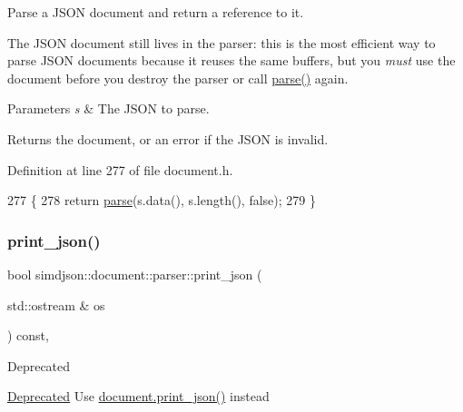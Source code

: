 Parse a J\+S\+ON document and return a reference to it. 

The J\+S\+ON document still lives in the parser\+: this is the most efficient way to parse J\+S\+ON documents because it reuses the same buffers, but you {\itshape must} use the document before you destroy the parser or call \hyperlink{classsimdjson_1_1document_1_1parser_a3eb1fd46ea0dad62eceed4b1c302b7ad}{parse()} again.


\begin{DoxyParams}{Parameters}
{\em s} & The J\+S\+ON to parse. \\
\hline
\end{DoxyParams}
\begin{DoxyReturn}{Returns}
the document, or an error if the J\+S\+ON is invalid. 
\end{DoxyReturn}


Definition at line 277 of file document.\+h.


\begin{DoxyCode}
277                                                                                           \{
278   \textcolor{keywordflow}{return} \hyperlink{classsimdjson_1_1document_1_1parser_a3eb1fd46ea0dad62eceed4b1c302b7ad}{parse}(s.data(), s.length(), \textcolor{keyword}{false});
279 \}
\end{DoxyCode}
\mbox{\label{classsimdjson_1_1document_1_1parser_ad6f0ed13d1344e219ba76c491158a05c}} 
\subsubsection{\texorpdfstring{print\+\_\+json()}{print\_json()}}
{\footnotesize\ttfamily bool simdjson\+::document\+::parser\+::print\+\_\+json (\begin{DoxyParamCaption}\item[{std\+::ostream \&}]{os }\end{DoxyParamCaption}) const\hspace{0.3cm}{\ttfamily [inline]}, {\ttfamily [noexcept]}}

\begin{DoxyRefDesc}{Deprecated}
\item[\hyperlink{deprecated__deprecated000009}{Deprecated}]Use {\ttfamily \hyperlink{classsimdjson_1_1document_ad33e6862de5cd09b2a16b10a90768360}{document.\+print\+\_\+json()}} instead \end{DoxyRefDesc}


